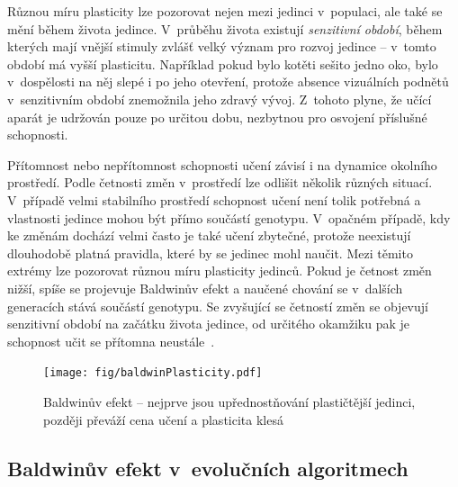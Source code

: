 Různou míru plasticity lze pozorovat nejen mezi jedinci v~populaci, ale také se mění během života jedince. V~průběhu života existují \emph{senzitivní období}, během kterých mají vnější stimuly zvlášť velký význam pro rozvoj jedince -- v~tomto období má vyšší plasticitu. Například pokud bylo kotěti sešito jedno oko, bylo v~dospělosti na něj slepé i po jeho otevření, protože absence vizuálních podnětů v~senzitivním období znemožnila jeho zdravý vývoj. Z~tohoto plyne, že učící aparát je udržován pouze po určitou dobu, nezbytnou pro osvojení příslušné schopnosti.

Přítomnost nebo nepřítomnost schopnosti učení závisí i na dynamice okolního prostředí. Podle četnosti změn v~prostředí lze odlišit několik různých situací. V~případě velmi stabilního prostředí schopnost učení není tolik potřebná a vlastnosti jedince mohou být přímo součástí genotypu. V~opačném případě, kdy ke změnám dochází velmi často je také učení zbytečné, protože neexistují dlouhodobě platná pravidla, které by se jedinec mohl naučit. Mezi těmito extrémy lze pozorovat různou míru plasticity jedinců. Pokud je četnost změn nižší, spíše se projevuje Baldwinův efekt a naučené chování se v~dalších generacích stává součástí genotypu. Se zvyšující se četností změn se objevují senzitivní období na začátku života jedince, od určitého okamžiku pak je schopnost učit se přítomna neustále~\cite{EllefsenBalancing}.

\begin{figure}[htb]
    \centering\texttt{[image: fig/baldwinPlasticity.pdf]}
    \caption{Baldwinův efekt -- nejprve jsou upřednostňování plastičtější jedinci, později převáží cena učení a plasticita klesá~\cite{EllefsenBalancing}}
    \label{obrBaldwin}
\end{figure}

\subsection{Baldwinův efekt v~evolučních algoritmech}

